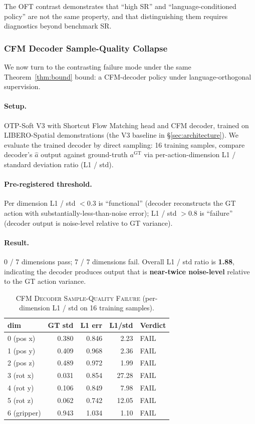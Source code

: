 The OFT contrast demonstrates that ``high SR'' and ``language-conditioned policy'' are
not the same property, and that distinguishing them requires diagnostics beyond
benchmark SR.

\subsubsection{CFM Decoder Sample-Quality Collapse}
\label{sec:results:cfm_collapse:result}

We now turn to the contrasting failure mode under the same Theorem~\ref{thm:bound}
bound: a CFM-decoder policy under language-orthogonal supervision.

\paragraph{Setup.}
OTP-Soft V3 with Shortcut Flow Matching head and CFM decoder, trained on LIBERO-Spatial
demonstrations (the V3 baseline in \S\ref{sec:architecture}). We evaluate the trained
decoder by direct sampling: 16 training samples, compare decoder's $\hat{a}$ output
against ground-truth $a^{\text{GT}}$ via per-action-dimension L1 / standard deviation
ratio (L1 / std).

\paragraph{Pre-registered threshold.}
Per dimension L1 / std $< 0.3$ is ``functional'' (decoder reconstructs the GT action
with substantially-less-than-noise error); L1 / std $> 0.8$ is ``failure'' (decoder
output is noise-level relative to GT variance).

\paragraph{Result.}
0 / 7 dimensions pass; 7 / 7 dimensions fail. Overall L1 / std ratio is \textbf{1.88},
indicating the decoder produces output that is \textbf{near-twice noise-level} relative
to the GT action variance.

\begin{table}[t]
\centering
\caption{\textsc{CFM Decoder Sample-Quality Failure} (per-dimension L1 / std on 16
training samples).}
\label{tab:cfm_collapse}
\small
\begin{tabular}{lrrrl}
\toprule
\textbf{dim} & \textbf{GT std} & \textbf{L1 err} & \textbf{L1/std} & \textbf{Verdict} \\
\midrule
0 (pos x)   & 0.380 & 0.846 & 2.23  & FAIL \\
1 (pos y)   & 0.409 & 0.968 & 2.36  & FAIL \\
2 (pos z)   & 0.489 & 0.972 & 1.99  & FAIL \\
3 (rot x)   & 0.031 & 0.854 & 27.28 & FAIL \\
4 (rot y)   & 0.106 & 0.849 & 7.98  & FAIL \\
5 (rot z)   & 0.062 & 0.742 & 12.05 & FAIL \\
6 (gripper) & 0.943 & 1.034 & 1.10  & FAIL \\
\bottomrule
\end{tabular}
\end{table}

